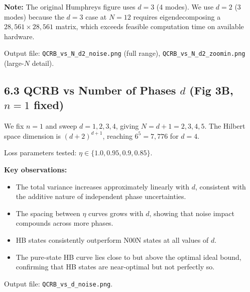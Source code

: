 \documentclass[12pt]{article}
\begin{document}
\textbf{Note:} The original Humphreys figure uses $d=3$ (4 modes). We use $d=2$ (3 modes) because the $d=3$ case at $N=12$ requires eigendecomposing a $28{,}561 \times 28{,}561$ matrix, which exceeds feasible computation time on available hardware.

Output file: \texttt{QCRB\_vs\_N\_d2\_noise.png} (full range), \texttt{QCRB\_vs\_N\_d2\_zoomin.png} (large-$N$ detail).

\subsection*{6.3 QCRB vs Number of Phases $d$ (Fig 3B, $n=1$ fixed)}
We fix $n=1$ and sweep $d = 1, 2, 3, 4$, giving $N = d+1 = 2, 3, 4, 5$. The Hilbert space dimension is $(d+2)^{d+1}$, reaching $6^5 = 7{,}776$ for $d=4$.

Loss parameters tested: $\eta \in \{1.0, 0.95, 0.9, 0.85\}$.

\textbf{Key observations:}
\begin{itemize}
    \item The total variance increases approximately linearly with $d$, consistent with the additive nature of independent phase uncertainties.
    \item The spacing between $\eta$ curves grows with $d$, showing that noise impact compounds across more phases.
    \item HB states consistently outperform N00N states at all values of $d$.
    \item The pure-state HB curve lies close to but above the optimal ideal bound, confirming that HB states are near-optimal but not perfectly so.
\end{itemize}

Output file: \texttt{QCRB\_vs\_d\_noise.png}.
\end{document}
